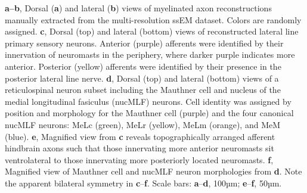 \documentclass{article}
\begin{document}
\noindent\textbf{a–b}, Dorsal (\textbf{a}) and lateral (\textbf{b}) views of myelinated axon reconstructions manually extracted from the multi-resolution ssEM dataset. Colors are randomly assigned. \textbf{c}, Dorsal (top) and lateral (bottom) views of reconstructed lateral line primary sensory neurons. Anterior (purple) afferents were identified by their innervation of neuromasts in the periphery, where darker purple indicates more anterior. Posterior (yellow) afferents were identified by their presence in the posterior lateral line nerve. \textbf{d}, Dorsal (top) and lateral (bottom) views of a reticulospinal neuron subset including the Mauthner cell and nucleus of the medial longitudinal fasiculus (nucMLF) neurons. Cell identity was assigned by position and morphology for the Mauthner cell (purple) and the
four canonical nucMLF neurons: MeLc (green), MeLr (yellow), MeLm (orange), and MeM (blue). \textbf{e}, Magnified view from \textbf{c} reveals topographically arranged afferent hindbrain axons such that those innervating more anterior neuromasts sit ventrolateral to those innervating more posteriorly located neuromasts. \textbf{f}, Magnified view of Mauthner cell and nucMLF neuron morphologies from \textbf{d}. Note the apparent bilateral symmetry in \textbf{c}–\textbf{f}. Scale bars: \textbf{a}–\textbf{d}, 100µm; \textbf{e}–\textbf{f}, 50µm.
\end{document}

